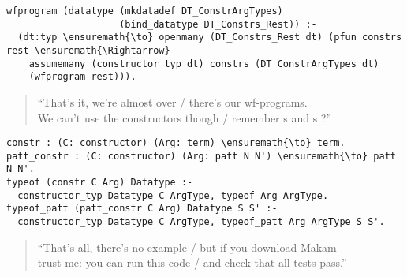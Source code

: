 \begin{verbatim}
wfprogram (datatype (mkdatadef DT_ConstrArgTypes)
                    (bind_datatype DT_Constrs_Rest)) :-
  (dt:typ \ensuremath{\to} openmany (DT_Constrs_Rest dt) (pfun constrs rest \ensuremath{\Rightarrow}
    assumemany (constructor_typ dt) constrs (DT_ConstrArgTypes dt)
    (wfprogram rest))).
\end{verbatim}

\begin{verse}
``That's it, we're almost over / there's our wf-programs. \\
We can't use the constructors though / remember s and s ?''
\end{verse}

\begin{verbatim}
constr : (C: constructor) (Arg: term) \ensuremath{\to} term.
patt_constr : (C: constructor) (Arg: patt N N') \ensuremath{\to} patt N N'.
typeof (constr C Arg) Datatype :-
  constructor_typ Datatype C ArgType, typeof Arg ArgType.
typeof_patt (patt_constr C Arg) Datatype S S' :-
  constructor_typ Datatype C ArgType, typeof_patt Arg ArgType S S'.
\end{verbatim}

\begin{verse}
``That's all, there's no example / but if you download Makam \\
trust me: you can run this code / and check that all tests pass.''
\end{verse}
